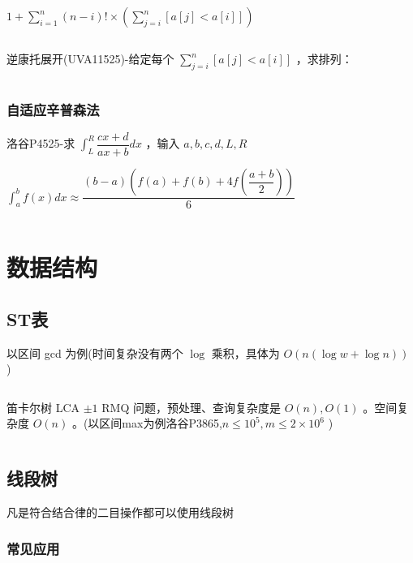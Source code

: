 \documentclass[twocolumn,10pt]{ctexart}
\begin{document}
\begin{adjustbox}{max width=\linewidth,center}
$1+\sum_{i=1}^n(n-i)!\times(\sum_{j=i}^n[a[j]<a[i]])$
\end{adjustbox}

\inputminted{cpp}{code/p5367_cantor.cpp}

逆康托展开(UVA11525)-给定每个 $\sum_{j=i}^n[a[j]<a[i]]$ ，求排列：

\inputminted{cpp}{code/uva11525_reverse_cantor.cpp}

\subsubsection{自适应辛普森法}

\begin{notebox}
洛谷P4525-求 $\int_L^R\dfrac{cx+d}{ax+b}dx$ ，输入 $a,b,c,d,L,R$
\end{notebox}

\begin{adjustbox}{max width=\linewidth,center}
$\int_a^bf(x)dx\approx\dfrac{(b-a)(f(a)+f(b)+4f(\dfrac{a+b}2))}6$
\end{adjustbox}

\inputminted{cpp}{code/ext_017.cpp}

\section{数据结构}

\subsection{ST表}

以区间 gcd 为例(时间复杂没有两个 $\log$ 乘积，具体为 $O(n(\log w+\log n))$ )

\inputminted{cpp}{code/st_table.cpp}

笛卡尔树 LCA $\pm1$ RMQ 问题，预处理、查询复杂度是 $O(n), O(1)$ 。空间复杂度 $O(n)$ 。(以区间max为例洛谷P3865,$n\le10^5,m\le2\times10^6$ )

\inputminted{cpp}{code/p3865_cartesian_tree.cpp}

\subsection{线段树}

凡是符合结合律的二目操作都可以使用线段树

\subsubsection{常见应用}
\end{document}
